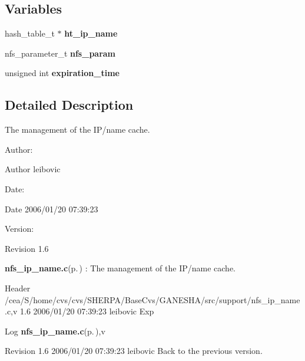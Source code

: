 \subsection*{Variables}
\begin{CompactItemize}
\item 
hash\_\-table\_\-t $\ast$ {\bf ht\_\-ip\_\-name}
\item 
nfs\_\-parameter\_\-t {\bf nfs\_\-param}
\item 
unsigned int {\bf expiration\_\-time}
\end{CompactItemize}


\subsection{Detailed Description}
The management of the IP/name cache. 

\begin{Desc}
\item[Author:]\begin{Desc}
\item[Author]leibovic \end{Desc}
\end{Desc}
\begin{Desc}
\item[Date:]\begin{Desc}
\item[Date]2006/01/20 07:39:23 \end{Desc}
\end{Desc}
\begin{Desc}
\item[Version:]\begin{Desc}
\item[Revision]1.6 \end{Desc}
\end{Desc}
{\bf nfs\_\-ip\_\-name.c}{\rm (p.\,\pageref{nfs__ip__name_8c})} : The management of the IP/name cache.

\begin{Desc}
\item[Header]/cea/S/home/cvs/cvs/SHERPA/Base\-Cvs/GANESHA/src/support/nfs\_\-ip\_\-name.c,v 1.6 2006/01/20 07:39:23 leibovic Exp \end{Desc}


\begin{Desc}
\item[Log]{\bf nfs\_\-ip\_\-name.c}{\rm (p.\,\pageref{nfs__ip__name_8c})},v \end{Desc}
Revision 1.6 2006/01/20 07:39:23 leibovic Back to the previous version.

